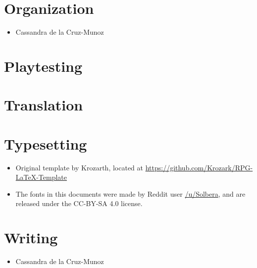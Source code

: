 \section{Organization}
\begin{itemize}
	\item Cassandra de la Cruz-Munoz
\end{itemize}

\section{Playtesting}

\section{Translation}

\section{Typesetting}
\begin{itemize}
    \item Original template by Krozarth, located at \url{https://github.com/Krozark/RPG-LaTeX-Template}
    \item The fonts in this documents were made by Reddit user \href{https://old.reddit.com/u/Solbera}{/u/Solbera}, and are released under the CC-BY-SA 4.0 license.
\end{itemize}

\section{Writing}
\begin{itemize}
	\item Cassandra de la Cruz-Munoz
\end{itemize}

